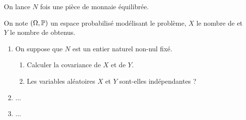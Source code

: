 \begin{corr}
\end{corr}

\begin{exo}
On lance \(N\) fois une pièce de monnaie équilibrée.

On note \(\groupe{\Omega}[\prem]\) un espace probabilisé modélisant le problème, \(X\) le nombre de  et \(Y\) le nombre de  obtenus.

\begin{enumerate}
    \item On suppose que \(N\) est un entier naturel non-nul fixé. \\ \begin{enumerate}
        \item Calculer la covariance de \(X\) et de \(Y\). \\
        \item Les variables aléatoires \(X\) et \(Y\) sont-elles indépendantes ? \\
    \end{enumerate}
    \item ... \\
    \item ...
\end{enumerate}
\end{exo}

\begin{corr}
\end{corr}

